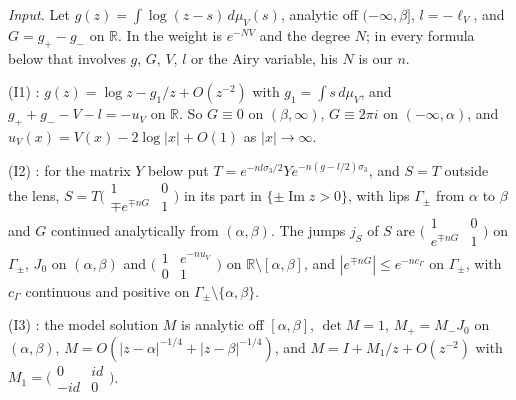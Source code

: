\documentclass[11pt]{amsart}
\theoremstyle{definition}
\theoremstyle{remark}
\numberwithin{equation}{section}
\newcommand{\R}{\mathbb{R}}
\DeclareMathOperator{\im}{Im}
\begin{document}
\emph{Input.} Let $g(z)=\int\log(z-s)\,d\mu_V(s)$, analytic off $(-\infty,\beta]$, $l=-\ell_V$, and $G=g_+-g_-$ on $\R$. In \cite{Bl} the weight is $e^{-NV}$ and the degree $N$; in every formula below that involves $g$, $G$, $V$, $l$ or the Airy variable, his $N$ is our $n$.

(I1) \cite[(5.5)--(5.15)]{Bl}: $g(z)=\log z-g_1/z+O(z^{-2})$ with $g_1=\int s\,d\mu_V$, and $g_++g_--V-l=-u_V$ on $\R$. So $G\equiv0$ on $(\beta,\infty)$, $G\equiv2\pi i$ on $(-\infty,\alpha)$, and $u_V(x)=V(x)-2\log|x|+O(1)$ as $|x|\to\infty$.

(I2) \cite[(6.2)--(6.3), (7.1)--(7.8)]{Bl}: for the matrix $Y$ below put $T=e^{-nl\sigma_3/2}Ye^{-n(g-l/2)\sigma_3}$, and $S=T$ outside the lens, $S=T\bigl(\begin{smallmatrix}1&0\\\mp e^{\mp nG}&1\end{smallmatrix}\bigr)$ in its part in $\{\pm\im z>0\}$, with lips $\Gamma_\pm$ from $\alpha$ to $\beta$ and $G$ continued analytically from $(\alpha,\beta)$. The jumps $j_S$ of $S$ are $\bigl(\begin{smallmatrix}1&0\\e^{\mp nG}&1\end{smallmatrix}\bigr)$ on $\Gamma_\pm$, $J_0$ on $(\alpha,\beta)$ and $\bigl(\begin{smallmatrix}1&e^{-nu_V}\\0&1\end{smallmatrix}\bigr)$ on $\R\setminus[\alpha,\beta]$, and $|e^{\mp nG}|\le e^{-nc_\Gamma}$ on $\Gamma_\pm$, with $c_\Gamma$ continuous and positive on $\Gamma_\pm\setminus\{\alpha,\beta\}$.

(I3) \cite[(8.4)--(8.8)]{Bl}: the model solution $M$ is analytic off $[\alpha,\beta]$, $\det M=1$, $M_+=M_-J_0$ on $(\alpha,\beta)$, $M=O(|z-\alpha|^{-1/4}+|z-\beta|^{-1/4})$, and $M=I+M_1/z+O(z^{-2})$ with $M_1=\bigl(\begin{smallmatrix}0&id\\-id&0\end{smallmatrix}\bigr)$.
\end{document}
